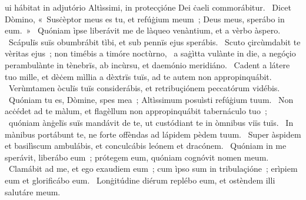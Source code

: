 \psalmChapterWithInscription{}
{ }
{%
ui hábitat in adjutório Altìssimi, in protecçióne Dei ċaeli commorábitur. 
~Dicet Dòmino, «~Susċèptor meus es tu, et refúġium meum~; Deus meus, sperábo in eum.~»
~Quóniam ìpse liberávit me de làqueo venàntium, et a vèrbo àspero. 
~Scápulïs suïs obumbrábit tìbi, et sub pennïs ejus sperábis. 
~Scuto çircùmdabit te vèritas ejus~; non timébis a timóre noctùrno, 
~a saġìtta vulànte in die, a negóçio perambulànte in tènebrïs, ab incùrsu, et daemónio meridiáno. 
~Cadent a látere tuo mille, et dèċem mìllia a dèxtrïs tuïs, ad te autem non appropinquábit. 
~Verùmtamen òculïs tuïs considerábis, et retribuçiónem peccatórum vidébis. 
~Quóniam tu es, Dòmine, spes mea~; Altìssimum posuìsti refúġium tuum. 
~Non acċédet ad te màlum, et flagèllum non appropinquábit tabernáculo tuo~; 
~quóniam ànġelïs suïs mandávit de te, ut custódiant te in òmnibus viïs tuïs. 
~In mànibus portábunt te, ne forte offèndas ad lápidem pèdem tuum. 
~Super àspidem et basilìscum ambulábis, et conculcábis leónem et dracónem. 
~Quóniam in me sperávit, liberábo eum~; prótegem eum, quóniam cognóvit nomen meum. 
~Clamábit ad me, et ego exaudiem eum~; cum ìpso sum in tribulaçióne~; erìpiem eum et glorificábo eum. 
~Lonġitúdine diérum replébo eum, et ostèndem illi salutáre meum. 
}
